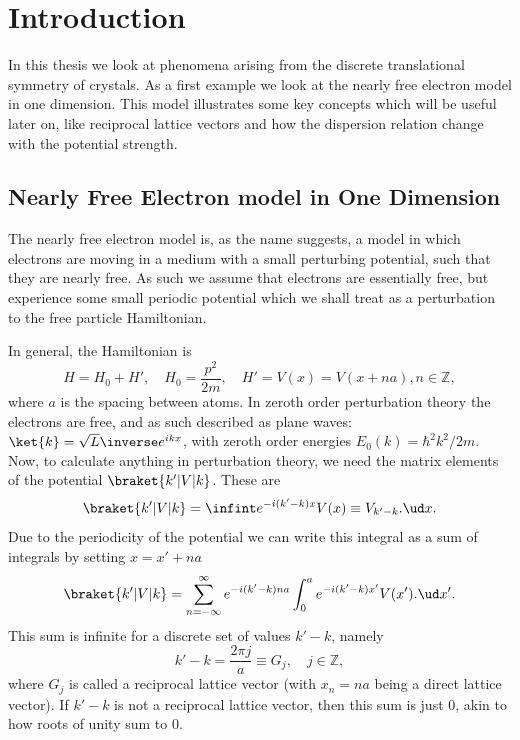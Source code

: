 \documentclass[main.tex]{subfiles}
\begin{document}
	\section{Introduction}
	In this thesis we look at phenomena arising from the discrete translational symmetry of crystals. As a first example we look at the nearly free electron model in one dimension. This model illustrates some key concepts which will be useful later on, like reciprocal lattice vectors and how the dispersion relation change with the potential strength.
	
	\subsection{Nearly Free Electron model in One Dimension}\label{sec:nearly_free}
	The nearly free electron model is, as the name suggests, a model in which electrons are moving in a medium with a small perturbing potential, such that they are nearly free. As such we assume that electrons are essentially free, but experience some small periodic potential which we shall treat as a perturbation to the free particle Hamiltonian.
	
	In general, the Hamiltonian is
	\begin{equation}
		H = H_0 + H', \quad H_0 = \frac{p^2}{2m}, \quad H' = V(x) = V(x + na), n \in \mathbb{Z},
	\end{equation}
	where $ a $ is the spacing between atoms. In zeroth order perturbation theory the electrons are free, and as such described as plane waves: $ \ket{k} = \sqrt{L}\inverse e^{ikx} $, with zeroth order energies $ E_0(k)= \hbar^2 k^2/2m $. Now, to calculate anything in perturbation theory, we need the matrix elements of the potential $ \braket{k' | V | k} $. These are
	\begin{equation}
		\braket{k' | V | k} = \infint e^{-i(k'-k)x} V(x) \equiv V_{k'-k}.\ud x.
	\end{equation}
	Due to the periodicity of the potential we can write this integral as a sum of integrals by setting $ x=x'+na $
	\begin{equation}
		\braket{k' | V | k} = \sum_{n = -\infty}^{\infty} e^{-i(k'-k) na} \int_{0}^{a} e^{-i(k'-k)x'} V(x').\ud x'.
	\end{equation}
	This sum is infinite for a discrete set of values $ k'-k $, namely
	\begin{equation}
		k'-k = \frac{2\pi j}{a} \equiv G_j, \quad j \in \mathbb{Z},
	\end{equation}
	where $ G_j $ is called a reciprocal lattice vector (with $ x_n=na $ being a direct lattice vector). If $ k'-k $ is not a reciprocal lattice vector, then this sum is just 0, akin to how roots of unity sum to 0.
	
\end{document}
